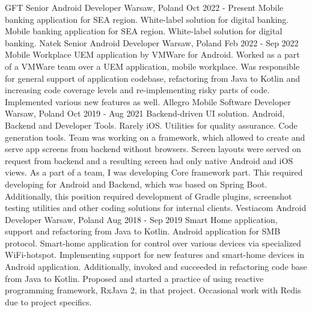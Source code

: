 
\cvexperience
  {GFT}
  {Senior Android Developer}
  {Warsaw, Poland}
  {Oct 2022 - Present}
  {
    Mobile banking application for SEA region.
    \newline
    White-label solution for digital banking.
  }
  {
    Mobile banking application for SEA region.
    \newline
    White-label solution for digital banking.
  }
\cvexperience
  {Natek}
  {Senior Android Developer}
  {Warsaw, Poland}
  {Feb 2022 - Sep 2022}
  {
    Mobile Workplace UEM application by VMWare for Android.
  }
  {
    Worked as a part of a VMWare team over a UEM application, mobile workplace. 
    \newline
    Was responsible for general support of application codebase, refactoring from Java to Kotlin and
    increasing code coverage levels and re-implementing risky parts of code.
    Implemented various new features as well.
  }
\cvexperience
  {Allegro}
  {Mobile Software Developer}
  {Warsaw, Poland}
  {Oct 2019 - Aug 2021}
  {
    Backend-driven UI solution. Android, Backend and Developer Tools. Rarely iOS.
    \newline
    Utilities for quality assurance. Code generation tools.
  }
  {
    Team was working on a framework, which allowed to create and serve app screens from backend without browsers.
    \newline
    Screen layouts were served on request from backend and a resulting screen had only native Android and iOS views.
    \newline
    As a part of a team, I was developing Core framework part.
    This required developing for Android and Backend, which was based on Spring Boot.
    Additionally, this position required development of Gradle plugins, screenshot testing utilities and
    other coding solutions for internal clients.
  }
\cvexperience
  {Vestiacom}
  {Android Developer}
  {Warsaw, Poland}
  {Aug 2018 - Sep 2019}
  {
    Smart Home application, support and refactoring from Java to Kotlin.
    \newline
    Android application for SMB protocol.
  }
  {
    Smart-home application for control over various devices via specialized WiFi-hotspot.
    Implementing support for new features and smart-home devices in Android application.
    Additionally, invoked and succeeded in refactoring code base from Java to Kotlin.
    \newline
    Proposed and started a practice of using reactive programming framework, RxJava 2, in that project.
    Occasional work with Redis due to project specifics.
  }
